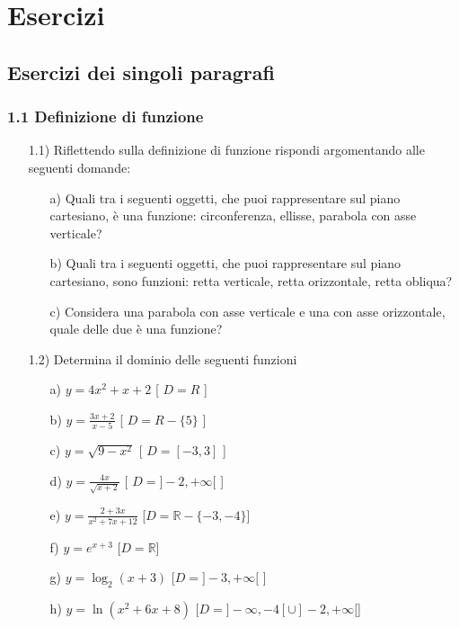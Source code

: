 \newpage 
\section{Esercizi}
  \subsection{Esercizi dei singoli paragrafi}
  \subsubsection*{1.1 Definizione di funzione}
  \begin{itemize}
  \item[1.1)] Riflettendo sulla definizione di 
funzione rispondi argomentando alle seguenti domande:
  \begin{itemize}
  \item[a)] Quali tra i 
seguenti oggetti, che puoi rappresentare sul piano cartesiano, è una 
funzione: circonferenza, ellisse, parabola con asse verticale?
  \item[b)] Quali tra i 
seguenti oggetti, che puoi rappresentare sul piano cartesiano, sono funzioni: 
retta verticale, retta orizzontale, retta obliqua?
  \item[c)] Considera una 
parabola con asse verticale e una con asse orizzontale, quale delle due è una 
funzione?
  \end{itemize}
  \item[1.2)] Determina il dominio delle 
seguenti funzioni
  \begin{itemize}
  \item[a)] $y= 4x^2+x+2$   
   \hfill  [ $D=R$ ]
  \item[b)] 
$y=\frac{3x+2}{x-5}$   \hfill   
   [ $D=R-\{5\}$ ]
  \item[c)] $y=\sqrt{9-x^2}   $ 
   \hfill   [ $D=[-3, 3]$ ]
  \item[d)] 
$y=\frac{4x}{\sqrt{x+2}}  $  \hfill   
   [ $D=]-2,+\infty[$ ]
  \item[e)] 
$y=\frac{2+3x}{x^2+7x+12}$   \hfill   
[$D=\mathbb{R}-\{-3,-4\}$]
  \item[f)] $y=e^{x+3}$\hfill   
   [$D=\mathbb{R}$]
  \item[g)] $y=\log_2(x+3)$  
\hfill  [$D=]-3, +\infty[$ ]
  \item [h)] $y=\ln(x^2+6x+8)$  
  \hfill   
[$D=]-\infty,-4[\cup]-2,+\infty[$]
  

\end{itemize}
\end{itemize}
